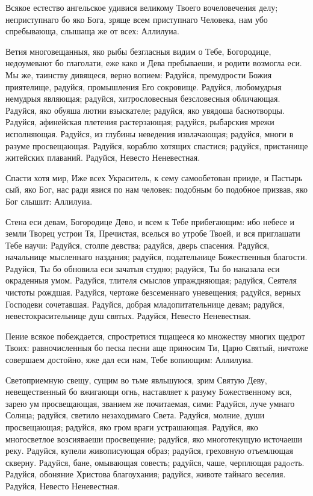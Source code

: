\begin{mymulticols}

Всякое естество ангельское удивися великому Твоего вочеловечения делу; неприступнаго бо яко Бога, зряще всем приступнаго Человека, нам убо спребывающа, слышаща же от всех: Аллилуиа.


Ветия многовещанныя, яко рыбы безгласныя видим о Тебе, Богородице, недоумевают бо глаголати, еже како и Дева пребываеши, и родити возмогла еси. Мы же, таинству дивящеся, верно вопием: Радуйся, премудрости Божия приятелище, радуйся, промышления Его сокровище. Радуйся, любомудрыя немудрыя являющая; радуйся, хитрословесныя безсловесныя обличающая. Радуйся, яко обуяша лютии взыскателе; радуйся, яко увядоша баснотворцы. Радуйся, афинейская плетения растерзающая; радуйся, рыбарския мрежи исполняющая. Радуйся, из глубины неведения извлачающая; радуйся, многи в разуме просвещающая. Радуйся, кораблю хотящих спастися; радуйся, пристанище житейских плаваний. Радуйся, Невесто Неневестная.


Спасти хотя мир, Иже всех Украситель, к сему самообетован прииде, и Пастырь сый, яко Бог, нас ради явися по нам человек: подобным бо подобное призвав, яко Бог слышит: Аллилуиа.


Стена еси девам, Богородице Дево, и всем к Тебе прибегающим: ибо небесе и земли Творец устрои Тя, Пречистая, вселься во утробе Твоей, и вся приглашати Тебе научи: Радуйся, столпе девства; радуйся, дверь спасения. Радуйся, начальнице мысленнаго наздания; радуйся, подательнице Божественныя благости. Радуйся, Ты бо обновила еси зачатыя студно; радуйся, Ты бо наказала еси окраденныя умом. Радуйся, тлителя смыслов упраждняющая; радуйся, Сеятеля чистоты рождшая. Радуйся, чертоже безсеменнаго уневещения; радуйся, верных Господеви сочетавшая. Радуйся, добрая младопитательнице девам; радуйся, невестокрасительнице душ святых. Радуйся, Невесто Неневестная.


Пение всякое побеждается, спростретися тщащееся ко множеству многих щедрот Твоих: равночисленныя бо песка песни аще приносим Ти, Царю Святый, ничтоже совершаем достойно, яже дал еси нам, Тебе вопиющим: Аллилуиа.


Светоприемную свещу, сущим во тьме явльшуюся, зрим Святую Деву, невещественный бо вжигающи огнь, наставляет к разуму Божественному вся, зарею ум просвещающая, званием же почитаемая, сими: Радуйся, луче умнаго Солнца; радуйся, светило незаходимаго Света. Радуйся, молние, души просвещающая; радуйся, яко гром враги устрашающая. Радуйся, яко многосветлое возсияваеши просвещение; радуйся, яко многотекущую источаеши реку. Радуйся, купели живописующая образ; радуйся, греховную отъемлющая скверну. Радуйся, бане, омывающая совесть; радуйся, чаше, черплющая радocть. Радуйся, обоняние Христова благоухания; радуйся, животе тайнаго веселия. Радуйся, Невесто Неневестная.


\end{mymulticols}
